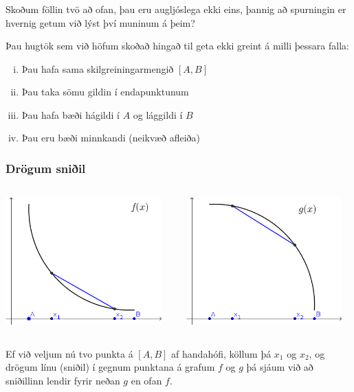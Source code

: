 \documentclass[icelandic,a4paper,12pt]{article}
\begin{document}
\subsubsection{}
Skoðum föllin tvö að ofan,
þau eru augljóslega ekki eins, þannig að spurningin er hvernig getum
við lýst því muninum á þeim?

Þau hugtök sem við höfum skoðað hingað til geta ekki greint á milli
þessara falla:
\begin{enumerate}[(i)]
\item Þau hafa sama skilgreiningarmengið $[A,B]$\pause
\item Þau taka sömu gildin í endapunktunum\pause
\item Þau hafa bæði hágildi í $A$ og lággildi í $B$\pause
\item Þau eru bæði minnkandi \pause (neikvæð afleiða)
\end{enumerate}

 


\subsubsection{Drögum sniðil}
\begin{columns}[c] %
\begin{column}{.5\textwidth}
\includegraphics[width=6cm,keepaspectratio=true]{./myndir/kafli05/01_f2.png}
\end{column}
\begin{column}{.5\textwidth}
\includegraphics[width=6cm,keepaspectratio=true]{./myndir/kafli05/01_g2.png}
\end{column}
\end{columns}
Ef við veljum nú tvo punkta á $[A,B]$ af handahófi, köllum þá $x_1$ og $x_2$, og drögum línu (sniðil)
í gegnum punktana á grafum $f$ og $g$ þá sjáum við 
að sniðillinn lendir fyrir neðan $g$ en ofan $f$.
 
\end{document}
